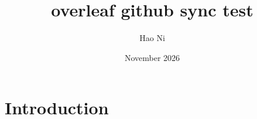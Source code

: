\documentclass{article}
\title{overleaf github sync test}
\author{Hao Ni}
\date{November 2026}
\begin{document}
\maketitle

\section{Introduction}
\end{document}
